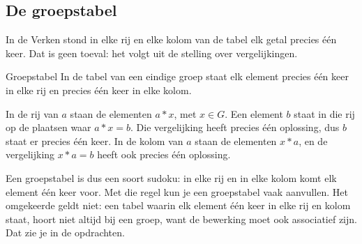 \subsection{De groepstabel}

In de Verken stond in elke rij en elke kolom van de tabel elk getal precies één keer. Dat is geen toeval: het volgt uit de stelling over vergelijkingen.

\begin{theorie}
\begin{stelling}{Groepstabel}
In de tabel van een eindige groep staat elk element precies één keer in elke rij en precies één keer in elke kolom.
\end{stelling}

\begin{bewijs}
In de rij van $a$ staan de elementen $a \ast x$, met $x \in G$. Een element $b$ staat in die rij op de plaatsen waar $a \ast x = b$. Die vergelijking heeft precies één oplossing, dus $b$ staat er precies één keer. In de kolom van $a$ staan de elementen $x \ast a$, en de vergelijking $x \ast a = b$ heeft ook precies één oplossing.
\end{bewijs}
\end{theorie}

Een groepstabel is dus een soort sudoku: in elke rij en in elke kolom komt elk element één keer voor. Met die regel kun je een groepstabel vaak aanvullen. Het omgekeerde geldt niet: een tabel waarin elk element één keer in elke rij en kolom staat, hoort niet altijd bij een groep, want de bewerking moet ook associatief zijn. Dat zie je in de opdrachten.

